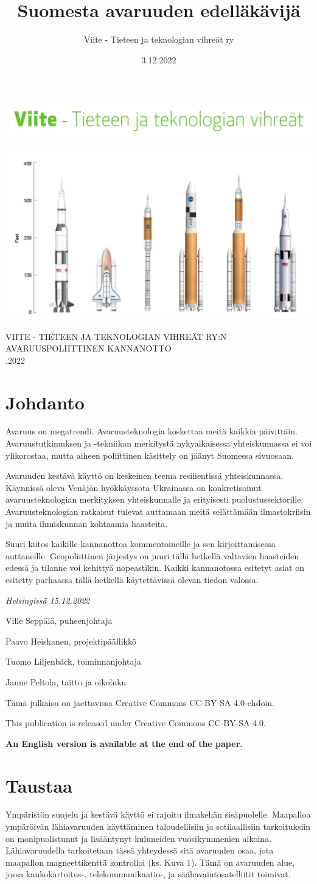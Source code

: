 \documentclass[nobib,finnish,oneside,openany,notoc,a4paper]{tufte-book}
\title{Suomesta avaruuden edelläkävijä}
\author{Viite - Tieteen ja teknologian vihreät ry}
\date{3.12.2022}
\newcommand{\textls}[2][5]{%
    \begingroup\addfontfeatures{LetterSpace=#1}#2\endgroup
  }
\renewcommand{\allcaps}[1]{\textls[15]{\MakeTextUppercase{#1}}}
\renewcommand{\maketitlepage}[0]{%
  \cleardoublepage%
  {%

  \sffamily%
  \begin{fullwidth}%
    \includegraphics[width=14cm]{Viite cmyk green.pdf}
  \vspace{8.5pc}%
  \fontsize{32}{50}\spartan{\par\noindent\textcolor{vihrea}{\allcaps{\thanklesstitle}}}
  \vspace{6pc}%
  
  \includegraphics[width=15cm]{etusivu.png}

  \vspace{4pc}%

  \fontsize{8}{16}\selectfont\par\noindent\allcaps{Viite - Tieteen ja teknologian vihreät ry:n avaruuspoliittinen kannanotto\\ \noindent 15.12.2022}%

  \end{fullwidth}%
  }

  \thispagestyle{empty}%
  \clearpage%
}
\begin{document}
\maketitlepage

\chapter{Johdanto}

Avaruus on megatrendi. Avaruusteknologia koskettaa meitä kaikkia
päivittäin. Avaruustutkimuksen ja -tekniikan merkitystä nykyaikaisessa
yhteiskunnassa ei voi ylikorostaa, mutta aiheen poliittinen käsittely on
jäänyt Suomessa sivuosaan.

Avaruuden kestävä käyttö on keskeinen teema resilientissä
yhteiskunnassa. Käynnissä oleva Venäjän hyökkäyssota Ukrainassa on
konkretisoinut avaruusteknologian merkityksen yhteiskunnalle ja
erityisesti puolustussektorille. Avaruusteknologian ratkaisut tulevat
auttamaan meitä selättämään ilmastokriisin ja muita ihmiskunnan
kohtaamia haasteita.

Suuri kiitos kaikille kannanottoa kommentoineille ja sen kirjoittamisessa
auttaneille. Geopoliittinen järjestys on juuri tällä hetkellä valtavien
haasteiden edessä ja tilanne voi kehittyä nopeastikin. Kaikki kannanotossa
esitetyt asiat on esitetty parhaassa tällä hetkellä käytettävissä olevan
tiedon valossa.

\textit{Helsingissä 15.12.2022}

Ville Seppälä, puheenjohtaja

Paavo Heiskanen, projektipäällikkö

Tuomo Liljenbäck, toiminnanjohtaja

Janne Peltola, taitto ja oikoluku

\vspace{5cm}

Tämä julkaisu on jaettavissa Creative Commons CC-BY-SA 4.0-ehdoin.

This publication is released under Creative Commons CC-BY-SA 4.0.

\textbf{An English version is available at the end of the paper. }

\chapter{Taustaa}

Ympäristön suojelu ja kestävä käyttö ei rajoitu ilmakehän sisäpuolelle.
Maapalloa ympäröivän lähiavaruuden käyttäminen taloudellisiin ja
sotilaallisiin tarkoituksiin on monipuolistunut ja lisääntynyt
kuluneiden vuosikymmenien aikoina. Lähiavaruudella tarkoitetaan tässä
yhteydessä sitä avaruuden osaa, jota maapallon magneettikenttä
kontrolloi (ks. Kuva 1). Tämä on avaruuden alue, jossa kaukokartoitus-,
telekommunikaatio-, ja säähavaintosatelliitit toimivat.
\end{document}
